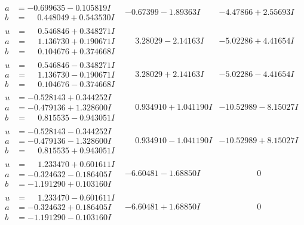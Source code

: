 \documentclass[1p]{elsarticle_modified}
\theoremstyle{definition}
\begin{document}
$$\begin{array}{c|c|c}
\begin{aligned}
a &= -0.699635 - 0.105819 I \\
b &= \phantom{-}0.448049 + 0.543530 I\end{aligned}
 & -0.67399 - 1.89363 I & -4.47866 + 2.55693 I \\ \hline\begin{aligned}
u &= \phantom{-}0.546846 + 0.348271 I \\
a &= \phantom{-}1.136730 + 0.190671 I \\
b &= \phantom{-}0.104676 + 0.374668 I\end{aligned}
 & \phantom{-}3.28029 - 2.14163 I & -5.02286 + 4.41654 I \\ \hline\begin{aligned}
u &= \phantom{-}0.546846 - 0.348271 I \\
a &= \phantom{-}1.136730 - 0.190671 I \\
b &= \phantom{-}0.104676 - 0.374668 I\end{aligned}
 & \phantom{-}3.28029 + 2.14163 I & -5.02286 - 4.41654 I \\ \hline\begin{aligned}
u &= -0.528143 + 0.344252 I \\
a &= -0.479136 + 1.328600 I \\
b &= \phantom{-}0.815535 - 0.943051 I\end{aligned}
 & \phantom{-}0.934910 + 1.041190 I & -10.52989 - 8.15027 I \\ \hline\begin{aligned}
u &= -0.528143 - 0.344252 I \\
a &= -0.479136 - 1.328600 I \\
b &= \phantom{-}0.815535 + 0.943051 I\end{aligned}
 & \phantom{-}0.934910 - 1.041190 I & -10.52989 + 8.15027 I \\ \hline\begin{aligned}
u &= \phantom{-}1.233470 + 0.601611 I \\
a &= -0.324632 - 0.186405 I \\
b &= -1.191290 + 0.103160 I\end{aligned}
 & -6.60481 - 1.68850 I & \phantom{-0.000000 } 0 \\ \hline\begin{aligned}
u &= \phantom{-}1.233470 - 0.601611 I \\
a &= -0.324632 + 0.186405 I \\
b &= -1.191290 - 0.103160 I\end{aligned}
 & -6.60481 + 1.68850 I & \phantom{-0.000000 } 0 \\ \hline\begin{aligned}

\end{aligned}
\end{array}$$
\end{document}
